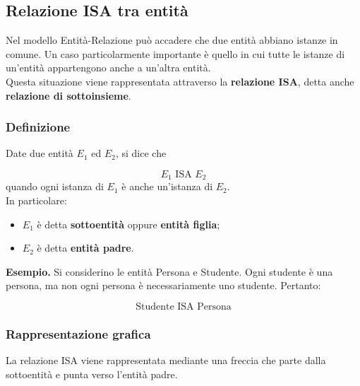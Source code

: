 \subsection{Relazione ISA tra entità}

Nel modello Entità-Relazione può accadere che
due entità abbiano istanze in comune.
Un caso particolarmente importante è quello
in cui tutte le istanze di un'entità appartengono
anche a un'altra entità.\\
Questa situazione viene rappresentata attraverso
la \textbf{relazione ISA}, detta anche
\textbf{relazione di sottoinsieme}.
\subsubsection*{Definizione}

Date due entità $E_1$ ed $E_2$, si dice che

\[
E_1 \text{ ISA } E_2
\]
quando ogni istanza di $E_1$ è anche
un'istanza di $E_2$.\\
In particolare:
\begin{itemize}
    \item $E_1$ è detta \textbf{sottoentità}
    oppure \textbf{entità figlia};

    \item $E_2$ è detta \textbf{entità padre}.
\end{itemize}
\noindent
\textcolor{verdeEsempio}{\textbf{Esempio.}}
Si considerino le entità Persona e Studente.
Ogni studente è una persona, ma non ogni
persona è necessariamente uno studente.
Pertanto:

\[
\text{Studente ISA Persona}
\]

\subsubsection*{Rappresentazione grafica}

La relazione ISA viene rappresentata mediante
una freccia che parte dalla sottoentità
e punta verso l'entità padre.

\begin{center}
\end{center}

